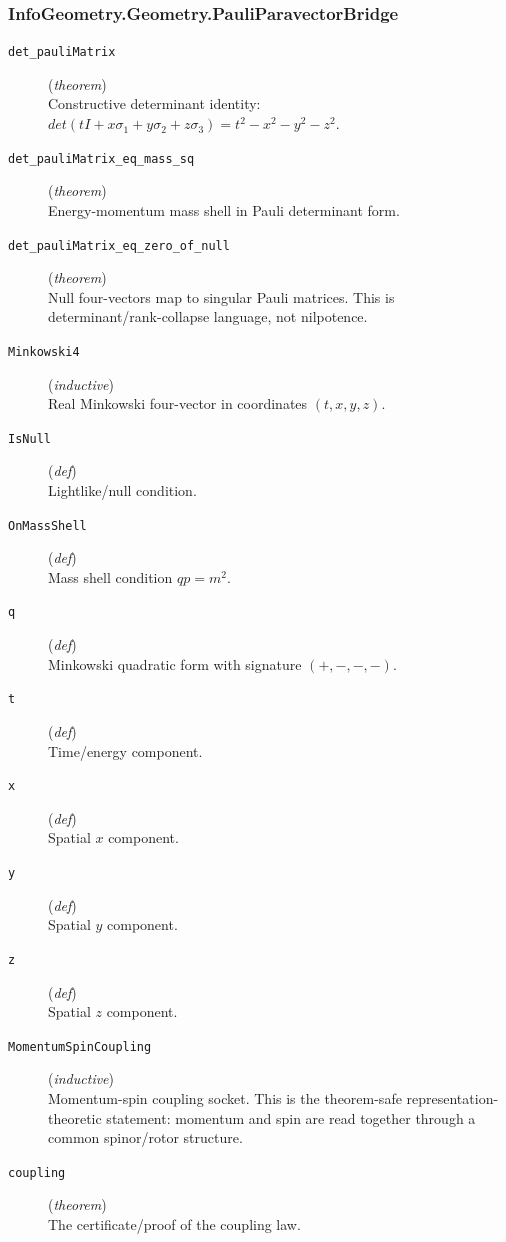 \documentclass[11pt,a4paper]{article}
\begin{document}
\subsubsection*{InfoGeometry.Geometry.PauliParavectorBridge}
\begin{description}
  \item[\texttt{det\_pauliMatrix}] (\textit{theorem}) \\ Constructive determinant identity: 
$det(t I + x \sigma _1  + y \sigma _2  + z \sigma _3 ) = t^2  - x^2  - y^2  - z^2 $.
  \item[\texttt{det\_pauliMatrix\_eq\_mass\_sq}] (\textit{theorem}) \\ Energy-momentum mass shell in Pauli determinant form.
  \item[\texttt{det\_pauliMatrix\_eq\_zero\_of\_null}] (\textit{theorem}) \\ Null four-vectors map to singular Pauli matrices. 
This is determinant/rank-collapse language, not nilpotence.
  \item[\texttt{Minkowski4}] (\textit{inductive}) \\ Real Minkowski four-vector in coordinates $(t,x,y,z)$.
  \item[\texttt{IsNull}] (\textit{def}) \\ Lightlike/null condition.
  \item[\texttt{OnMassShell}] (\textit{def}) \\ Mass shell condition $q p = m^2 $.
  \item[\texttt{q}] (\textit{def}) \\ Minkowski quadratic form with signature $(+, -, -, -)$.
  \item[\texttt{t}] (\textit{def}) \\ Time/energy component.
  \item[\texttt{x}] (\textit{def}) \\ Spatial $x$ component.
  \item[\texttt{y}] (\textit{def}) \\ Spatial $y$ component.
  \item[\texttt{z}] (\textit{def}) \\ Spatial $z$ component.
  \item[\texttt{MomentumSpinCoupling}] (\textit{inductive}) \\ Momentum-spin coupling socket. 
This is the theorem-safe representation-theoretic statement: momentum and spin 
are read together through a common spinor/rotor structure.
  \item[\texttt{coupling}] (\textit{theorem}) \\ The certificate/proof of the coupling law.

\end{description}
\end{document}
